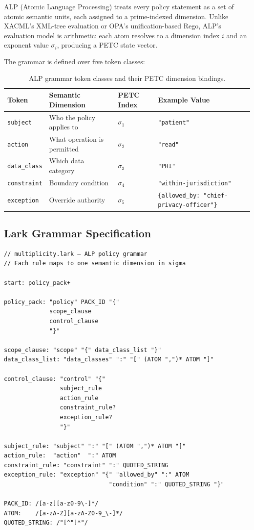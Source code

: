 \documentclass[12pt,letterpaper]{article}
\theoremstyle{definition}
\theoremstyle{remark}
\begin{document}
ALP (Atomic Language Processing) treats every policy statement as a set of atomic
semantic units, each assigned to a prime-indexed dimension. Unlike XACML's XML-tree
evaluation or OPA's unification-based Rego, ALP's evaluation model is arithmetic:
each atom resolves to a dimension index \(i\) and an exponent value \(\sigma_i\),
producing a PETC state vector.

The grammar is defined over five token classes:

\begin{table}[H]
\centering
\small
\begin{tabular}{@{}llll@{}}
\toprule
\textbf{Token} & \textbf{Semantic Dimension} & \textbf{PETC Index} & \textbf{Example Value} \\
\midrule
\texttt{subject}    & Who the policy applies to & \(\sigma_1\) & \texttt{"patient"} \\
\texttt{action}     & What operation is permitted & \(\sigma_2\) & \texttt{"read"} \\
\texttt{data\_class} & Which data category & \(\sigma_3\) & \texttt{"PHI"} \\
\texttt{constraint} & Boundary condition & \(\sigma_4\) & \texttt{"within-jurisdiction"} \\
\texttt{exception}  & Override authority & \(\sigma_5\) & \texttt{\{allowed\_by: "chief-privacy-officer"\}} \\
\bottomrule
\end{tabular}
\caption{ALP grammar token classes and their PETC dimension bindings.}
\end{table}

\subsection{Lark Grammar Specification}

\begin{noteboxtc}
\begin{lstlisting}[style=pythonstyle, caption={ALP grammar excerpt (multiplicity.lark)}, label={lst:grammar}]
// multiplicity.lark — ALP policy grammar
// Each rule maps to one semantic dimension in sigma

start: policy_pack+

policy_pack: "policy" PACK_ID "{"
             scope_clause
             control_clause
             "}"

scope_clause: "scope" "{" data_class_list "}"
data_class_list: "data_classes" ":" "[" (ATOM ",")* ATOM "]"

control_clause: "control" "{"
                subject_rule
                action_rule
                constraint_rule?
                exception_rule?
                "}"

subject_rule: "subject" ":" "[" (ATOM ",")* ATOM "]"
action_rule:  "action"  ":" ATOM
constraint_rule: "constraint" ":" QUOTED_STRING
exception_rule: "exception" "{" "allowed_by" ":" ATOM
                              "condition" ":" QUOTED_STRING "}"

PACK_ID: /[a-z][a-z0-9\-]*/
ATOM:    /[a-zA-Z][a-zA-Z0-9_\-]*/
QUOTED_STRING: /"[^"]*"/
\end{lstlisting}
\end{noteboxtc}
\end{document}
